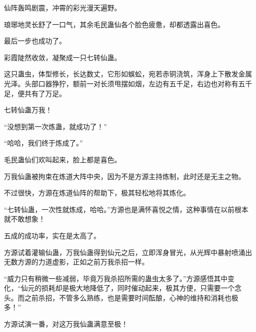 \begin{this_body}
仙阵轰鸣剧震，冲霄的彩光漫天遍野。

琅琊地灵长舒了一口气，其余毛民蛊仙各个脸色疲惫，却都透露出喜色。

最后一步也成功了。

彩霞陡然收敛，凝聚成一只七转仙蛊。

这只蛊虫，体型修长，长达数丈，它形如蜈蚣，宛若赤铜浇筑，浑身上下散发金属光泽。头部口器狰狞，额前一对长须甩摆如烟，左边有五千足，右边也对称有五千足，便共有了万足。

七转仙蛊万我！

“没想到第一次炼蛊，就成功了！”

“哈哈，我们终于炼成了。”

毛民蛊仙们欢叫起来，脸上都是喜色。

万我仙蛊被拘束在炼道大阵中央，因为不是方源主持炼制，此时还是无主之物。

不过很快，方源在炼道仙阵的帮助下，极其轻松地将其炼化。

“七转仙蛊，一次性就炼成，哈哈。”方源也是满怀喜悦之情，这种事情在以前根本就不敢想象！

五成的成功率，实在是太高了。

方源试着灌输仙蛊，万我仙蛊得到仙元之后，立即浑身冒光，从光辉中暴射喷涌出无数方源的力道虚影，正如之前万我杀招一样。

“威力只有稍微一些减弱，毕竟万我杀招所需的蛊虫太多了。”方源感悟其中变化，“仙元的损耗却是极大地降低了，同时催动起来，极其方便，只需要一个念头。而之前杀招，不管多么熟练，也是需要时间酝酿，心神的维持和消耗也极多！”

方源试演一番，对这万我仙蛊满意至极！

\end{this_body}

